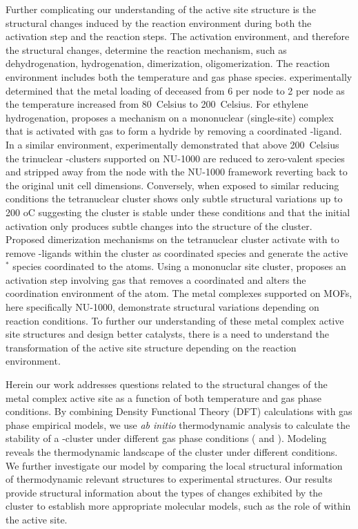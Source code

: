 Further complicating our understanding of the active site structure is the structural changes induced  by the reaction environment during both the activation step and the reaction steps. The activation environment, and therefore the structural changes, determine the reaction mechanism, such as dehydrogenation, hydrogenation, dimerization, oligomerization. The reaction environment includes both the temperature and gas phase species. \citeauthor{Kim2015} experimentally determined that the metal loading of  deceased from  6  per node to 2  per node as the temperature increased from \SI{80}{Celsius} to \SI{200}{Celsius}.\cite{Kim2015} For ethylene hydrogenation, \citeauthor{Li2016sintering} proposes a mechanism on a mononuclear (single-site)  complex that is activated with  gas to form a  hydride by removing a coordinated -ligand.\cite{Li2016sintering} In a similar  environment, \citeauthor{Halder2020} experimentally demonstrated that above \SI{200}{Celsius} the trinuclear -clusters supported on NU-1000 are reduced to zero-valent  species and stripped away from the node with the NU-1000 framework reverting back to the original unit cell dimensions.\cite{Halder2020} Conversely, when exposed to similar reducing conditions the tetranuclear  cluster shows only subtle structural variations up to 200 oC\cite{PlateroPrats2017} suggesting the cluster is stable under these conditions and that the initial activation only produces subtle changes into the structure of the cluster. Proposed dimerization mechanisms on the tetranuclear  cluster activate with  to remove -ligands within the cluster as coordinated  species and generate the active $^*$ species coordinated to the  atoms.\cite{Ye2017} Using a mononuclar site  cluster, \citeauthor{Li2017} proposes an activation step involving  gas that removes a coordinated  and alters the coordination environment of the  atom. The metal complexes supported on MOFs, here specifically NU-1000, demonstrate structural variations depending on reaction conditions. To further our understanding of these metal complex active site structures and design better catalysts, there is a need to understand the transformation of the active site structure depending on the reaction environment. 

Herein our work addresses questions related to the structural changes of the metal complex active site as a function of both temperature and gas phase conditions. By combining Density Functional Theory (DFT) calculations with gas phase empirical models, we use \textit{ab initio} thermodynamic analysis to calculate the stability of a -cluster under different gas phase conditions ( and ). Modeling reveals the thermodynamic landscape of the  cluster under different conditions. We further investigate our model by comparing the local structural information of thermodynamic relevant structures to experimental structures. Our results provide structural information about the types of changes exhibited by the cluster to establish more appropriate molecular models, such as the role of  within the active site.  



